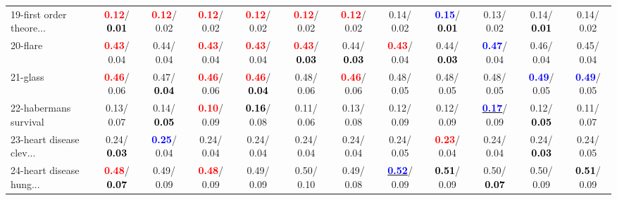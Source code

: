 \begin{table}[h]
\begin{center}
{\begin{tabular}{lc|c|c|c|c|c|c|c|c|c|c}
19-first order theore... & \textcolor{red}{\textbf{  0.12}}/\textcolor{black}{\textbf{  0.01}} & \textcolor{red}{\textbf{  0.12}}/  0.02 & \textcolor{red}{\textbf{  0.12}}/  0.02 & \textcolor{red}{\textbf{  0.12}}/  0.02 & \textcolor{red}{\textbf{  0.12}}/  0.02 & \textcolor{red}{\textbf{  0.12}}/  0.02 &   0.14/  0.02 & \textcolor{blue}{\textbf{  0.15}}/\textcolor{black}{\textbf{  0.01}} &   0.13/  0.02 &   0.14/\textcolor{black}{\textbf{  0.01}} &   0.14/  0.02 \\
20-flare & \textcolor{red}{\textbf{  0.43}}/  0.04 &   0.44/  0.04 & \textcolor{red}{\textbf{  0.43}}/  0.04 & \textcolor{red}{\textbf{  0.43}}/  0.04 & \textcolor{red}{\textbf{  0.43}}/\textcolor{black}{\textbf{  0.03}} &   0.44/\textcolor{black}{\textbf{  0.03}} & \textcolor{red}{\textbf{  0.43}}/  0.04 &   0.44/\textcolor{black}{\textbf{  0.03}} & \textcolor{blue}{\textbf{  0.47}}/  0.04 &   0.46/  0.04 &   0.45/  0.04 \\
21-glass & \textcolor{red}{\textbf{  0.46}}/  0.06 &   0.47/\textcolor{black}{\textbf{  0.04}} & \textcolor{red}{\textbf{  0.46}}/  0.06 & \textcolor{red}{\textbf{  0.46}}/\textcolor{black}{\textbf{  0.04}} &   0.48/  0.06 & \textcolor{red}{\textbf{  0.46}}/  0.06 &   0.48/  0.05 &   0.48/  0.05 &   0.48/  0.05 & \textcolor{blue}{\textbf{  0.49}}/  0.05 & \textcolor{blue}{\textbf{  0.49}}/  0.05 \\ \hline
22-habermans survival &   0.13/  0.07 &   0.14/\textcolor{black}{\textbf{  0.05}} & \textcolor{red}{\textbf{  0.10}}/  0.09 & \textcolor{black}{\textbf{  0.16}}/  0.08 &   0.11/  0.06 &   0.13/  0.08 &   0.12/  0.09 &   0.12/  0.09 & \underline{\textcolor{blue}{\textbf{  0.17}}}/  0.09 &   0.12/\textcolor{black}{\textbf{  0.05}} &   0.11/  0.07 \\
23-heart disease clev... &   0.24/\textcolor{black}{\textbf{  0.03}} & \textcolor{blue}{\textbf{  0.25}}/  0.04 &   0.24/  0.04 &   0.24/  0.04 &   0.24/  0.04 &   0.24/  0.04 &   0.24/  0.05 & \textcolor{red}{\textbf{  0.23}}/  0.04 &   0.24/  0.04 &   0.24/\textcolor{black}{\textbf{  0.03}} &   0.24/  0.05 \\
24-heart disease hung... & \textcolor{red}{\textbf{  0.48}}/\textcolor{black}{\textbf{  0.07}} &   0.49/  0.09 & \textcolor{red}{\textbf{  0.48}}/  0.09 &   0.49/  0.09 &   0.50/  0.10 &   0.49/  0.08 & \underline{\textcolor{blue}{\textbf{  0.52}}}/  0.09 & \textcolor{black}{\textbf{  0.51}}/  0.09 &   0.50/\textcolor{black}{\textbf{  0.07}} &   0.50/  0.09 & \textcolor{black}{\textbf{  0.51}}/  0.09 \\

\end{tabular}}
\end{center}
\end{table}

